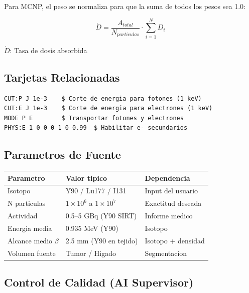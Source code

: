 \documentclass[12pt,a4paper]{article}
\newcommand{\vardef}[2]{\noindent\textbf{#1}: #2\\}
\begin{document}
Para MCNP, el peso se normaliza para que la suma de todos los pesos sea 1.0:

$$
\dot{D} = \frac{A_{total}}{N_{particulas}} \cdot \sum_{i=1}^{N} D_i
$$

\vardef{$\dot{D}$}{Tasa de dosis absorbida}

\subsection{Tarjetas Relacionadas}

\begin{verbatim}
CUT:P J 1e-3    $ Corte de energia para fotones (1 keV)
CUT:E J 1e-3    $ Corte de energia para electrones (1 keV)
MODE P E        $ Transportar fotones y electrones
PHYS:E 1 0 0 0 1 0 0.99  $ Habilitar e- secundarios
\end{verbatim}

\subsection{Parametros de Fuente}

\begin{center}
\begin{tabular}{lll}
\toprule
\textbf{Parametro} & \textbf{Valor tipico} & \textbf{Dependencia} \\
\midrule
Isotopo & Y90 / Lu177 / I131 & Input del usuario \\
N particulas & $1\times10^6$ a $1\times10^7$ & Exactitud deseada \\
Actividad & 0.5--5 GBq (Y90 SIRT) & Informe medico \\
Energia media & 0.935 MeV (Y90) & Isotopo \\
Alcance medio $\beta$ & 2.5 mm (Y90 en tejido) & Isotopo + densidad \\
Volumen fuente & Tumor / Higado & Segmentacion \\
\bottomrule
\end{tabular}
\end{center}

\subsection{Control de Calidad (AI Supervisor)}
\end{document}
